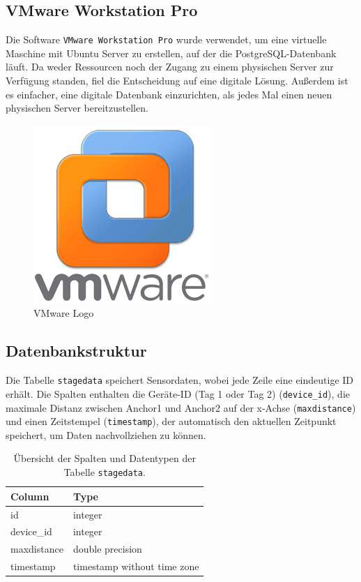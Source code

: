 \subsection{VMware Workstation Pro}
Die Software \texttt{VMware Workstation Pro} wurde verwendet, um eine virtuelle Maschine mit Ubuntu Server zu erstellen, auf der die PostgreSQL-Datenbank läuft. Da weder Ressourcen noch der Zugang zu einem physischen Server zur Verfügung standen, fiel die Entscheidung auf eine digitale Lösung. Außerdem ist es einfacher, eine digitale Datenbank einzurichten, als jedes Mal einen neuen physischen Server bereitzustellen.

\begin{figure}[H]
	\centering
	\includegraphics[width=0.3\linewidth]{images/VMware.png}
	\caption[VMware Logo]{VMware Logo}
	\label{fig:VMware}
\end{figure}

\newpage
\subsection{Datenbankstruktur}
Die Tabelle \texttt{stagedata} speichert Sensordaten, wobei jede Zeile eine eindeutige ID erhält. Die Spalten enthalten die Geräte-ID (Tag 1 oder Tag 2) (\texttt{device\_id}), die maximale Distanz zwischen Anchor1 und Anchor2 auf der x-Achse (\texttt{maxdistance}) und einen Zeitstempel (\texttt{timestamp}), der automatisch den aktuellen Zeitpunkt speichert, um Daten nachvollziehen zu können.
\begin{table}[h]
	\centering
	\begin{tabular}{|l|l|}
		\hline
		\textbf{Column} & \textbf{Type} \\
		\hline
		id & integer \\
		\hline
		device\_id & integer \\
		\hline
		maxdistance & double precision \\
		\hline
		timestamp & timestamp without time zone \\
		\hline
	\end{tabular}
	\caption{Übersicht der Spalten und Datentypen der Tabelle \texttt{stagedata}.}
	\label{tab:stagedata}
\end{table}

